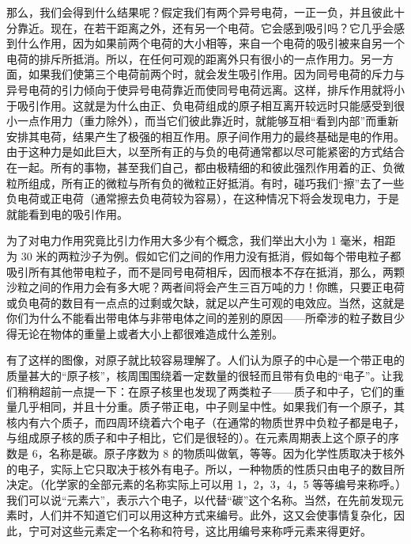 那么，我们会得到什么结果呢？假定我们有两个异号电荷，一正一负，并且彼此十分靠近。现在，在若干距离之外，还有另一个电荷。它会感到吸引吗？它几乎会感到什么作用，因为如果前两个电荷的大小相等，来自一个电荷的吸引被来自另一个电荷的排斥所抵消。所以，在任何可观的距离外只有很小的一点作用力。另一方面，如果我们使第三个电荷前两个时，就会发生吸引作用。因为同号电荷的斥力与异号电荷的引力倾向于使异号电荷靠近而使同号电荷远离。这样，排斥作用就将小于吸引作用。这就是为什么由正、负电荷组成的原子相互离开较远时只能感受到很小一点作用力（重力除外），而当它们彼此靠近时，就能够互相“看到内部”而重新安排其电荷，结果产生了极强的相互作用。原子间作用力的最终基础是电的作用。由于这种力是如此巨大，以至所有正的与负的电荷通常都以尽可能紧密的方式结合在一起。所有的事物，甚至我们自己，都由极精细的和彼此强烈作用着的正、负微粒所组成，所有正的微粒与所有负的微粒正好抵消。有时，碰巧我们“擦”去了一些负电荷或正电荷（通常擦去负电荷较为容易），在这种情况下将会发现电力，于是就能看到电的吸引作用。

为了对电力作用究竟比引力作用大多少有个概念，我们举出大小为 1 毫米，相距为 30 米的两粒沙子为例。假如它们之间的作用力没有抵消，假如每个带电粒子都吸引所有其他带电粒子，而不是同号电荷相斥，因而根本不存在抵消，那么，两颗沙粒之间的作用力会有多大呢？两者间将会产生三百万吨的力！你瞧，只要正电荷或负电荷的数目有一点点的过剩或欠缺，就足以产生可观的电效应。当然，这就是你们为什么不能看出带电体与非带电体之间的差别的原因——所牵涉的粒子数目少得无论在物体的重量上或者大小上都很难造成什么差别。

有了这样的图像，对原子就比较容易理解了。人们认为原子的中心是一个带正电的质量甚大的“原子核”，核周围围绕着一定数量的很轻而且带有负电的“电子”。让我们稍稍超前一点提一下：在原子核里也发现了两类粒子——质子和中子，它们的重量几乎相同，并且十分重。质子带正电，中子则呈中性。如果我们有一个原子，其核内有六个质子，而四周环绕着六个电子（在通常的物质世界中负粒子都是电子，与组成原子核的质子和中子相比，它们是很轻的）。在元素周期表上这个原子的序数是 6，名称是碳。原子序数为 8 的物质叫做氧，等等。因为化学性质取决于核外的电子，实际上它只取决于核外有电子。所以，一种物质的性质只由电子的数目所决定。（化学家的全部元素的名称实际上可以用 1，2，3，4，5 等等编号来称呼。）我们可以说“元素六”，表示六个电子，以代替“碳”这个名称。当然，在先前发现元素时，人们并不知道它们可以用这种方式来编号。此外，这又会使事情复杂化，因此，宁可对这些元素定一个名称和符号，这比用编号来称呼元素来得更好。

